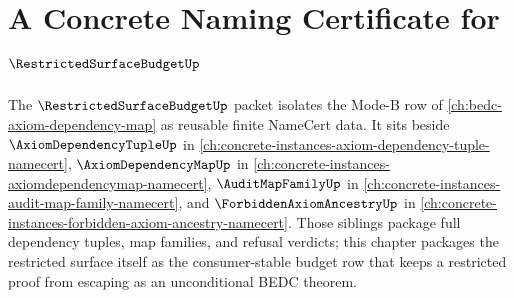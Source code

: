 \chapter{A Concrete Naming Certificate for $\RestrictedSurfaceBudgetUp$}
\label{ch:concrete-instances-restrictedsurfacebudget-namecert}

The $\RestrictedSurfaceBudgetUp$ packet isolates the Mode-B row of
\autoref{ch:bedc-axiom-dependency-map} as reusable finite NameCert data. It
sits beside $\AxiomDependencyTupleUp$ in
\autoref{ch:concrete-instances-axiom-dependency-tuple-namecert},
$\AxiomDependencyMapUp$ in
\autoref{ch:concrete-instances-axiomdependencymap-namecert},
$\AuditMapFamilyUp$ in
\autoref{ch:concrete-instances-audit-map-family-namecert}, and
$\ForbiddenAxiomAncestryUp$ in
\autoref{ch:concrete-instances-forbidden-axiom-ancestry-namecert}. Those
siblings package full dependency tuples, map families, and refusal verdicts;
this chapter packages the restricted surface itself as the consumer-stable
budget row that keeps a restricted proof from escaping as an unconditional
BEDC theorem.

